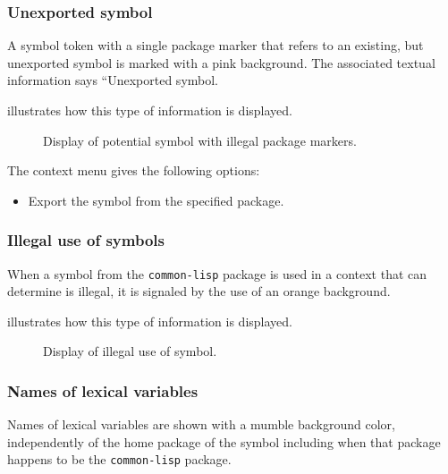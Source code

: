 \subsubsection{Unexported symbol}

A symbol token with a single package marker that refers to an
existing, but unexported symbol is marked with a pink background.  The
associated textual information says ``Unexported symbol.

 illustrates how this type of
information is displayed.

\begin{figure}
\begin{center}
\end{center}
\caption{\label{fig-unexported-symbol}
Display of potential symbol with illegal package markers.}
\end{figure}

The context menu gives the following options:

\begin{itemize}
\item Export the symbol from the specified package.
\end{itemize}

\subsubsection{Illegal use of \cl{} symbols}

When a symbol from the \texttt{common-lisp} package is used in a
context that \sysname{} can determine is illegal, it is signaled by
the use of an orange background. 

 illustrates how this type of
information is displayed.

\begin{figure}
\begin{center}
\end{center}
\caption{\label{fig-illegal-use-of-cl-symbol}
Display of illegal use of \cl{} symbol.}
\end{figure}

\subsubsection{Names of lexical variables}

Names of lexical variables are shown with a mumble%
background color, independently of the home package of the symbol
including when that package happens to be the \texttt{common-lisp}
package. 

